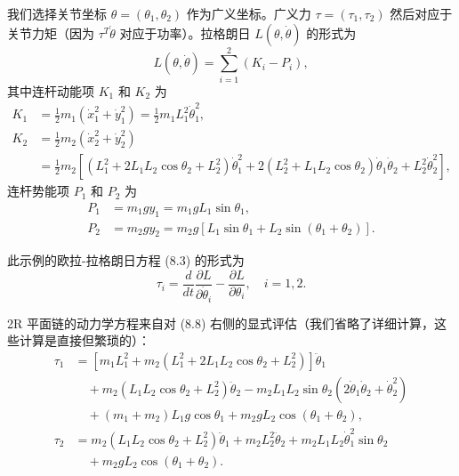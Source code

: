 \documentclass[12pt,a4paper]{article}
\begin{document}
我们选择关节坐标 $\theta = (\theta_1, \theta_2)$ 作为广义坐标。广义力 $\tau = (\tau_1, \tau_2)$ 然后对应于关节力矩（因为 $\tau^T \dot{\theta}$ 对应于功率）。拉格朗日 $L(\theta, \dot{\theta})$ 的形式为
\begin{equation}
L(\theta, \dot{\theta}) = \sum_{i=1}^{2} (K_i - P_i), \label{eq:8.7}
\end{equation}
其中连杆动能项 $K_1$ 和 $K_2$ 为
\begin{align}
K_1 &= \frac{1}{2}m_1(\dot{x}_1^2 + \dot{y}_1^2) = \frac{1}{2}m_1 L_1^2 \dot{\theta}_1^2, \\
K_2 &= \frac{1}{2}m_2(\dot{x}_2^2 + \dot{y}_2^2) \nonumber \\
&= \frac{1}{2}m_2\left[(L_1^2 + 2L_1 L_2 \cos \theta_2 + L_2^2)\dot{\theta}_1^2 + 2(L_2^2 + L_1 L_2 \cos \theta_2)\dot{\theta}_1 \dot{\theta}_2 + L_2^2 \dot{\theta}_2^2\right],
\end{align}
连杆势能项 $P_1$ 和 $P_2$ 为
\begin{align}
P_1 &= m_1 g y_1 = m_1 g L_1 \sin \theta_1, \\
P_2 &= m_2 g y_2 = m_2 g[L_1 \sin \theta_1 + L_2 \sin(\theta_1 + \theta_2)].
\end{align}

此示例的欧拉-拉格朗日方程 (8.3) 的形式为
\begin{equation}
\tau_i = \frac{d}{dt}\frac{\partial L}{\partial \dot{\theta}_i} - \frac{\partial L}{\partial \theta_i}, \quad i = 1, 2. \label{eq:8.8}
\end{equation}

2R 平面链的动力学方程来自对 (8.8) 右侧的显式评估（我们省略了详细计算，这些计算是直接但繁琐的）：
\begin{align}
\tau_1 &= \left[m_1 L_1^2 + m_2(L_1^2 + 2L_1 L_2 \cos \theta_2 + L_2^2)\right]\ddot{\theta}_1 \nonumber \\
&\quad + m_2(L_1 L_2 \cos \theta_2 + L_2^2)\ddot{\theta}_2 - m_2 L_1 L_2 \sin \theta_2(2\dot{\theta}_1 \dot{\theta}_2 + \dot{\theta}_2^2) \nonumber \\
&\quad + (m_1 + m_2)L_1 g \cos \theta_1 + m_2 g L_2 \cos(\theta_1 + \theta_2), \label{eq:8.9a} \\
\tau_2 &= m_2(L_1 L_2 \cos \theta_2 + L_2^2)\ddot{\theta}_1 + m_2 L_2^2 \ddot{\theta}_2 + m_2 L_1 L_2 \dot{\theta}_1^2 \sin \theta_2 \nonumber \\
&\quad + m_2 g L_2 \cos(\theta_1 + \theta_2). \label{eq:8.9b}
\end{align}
\end{document}
